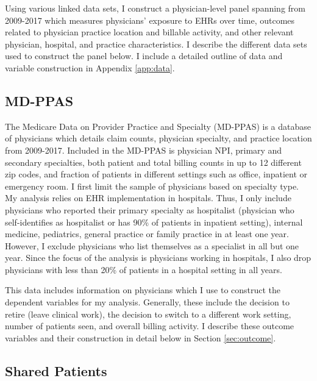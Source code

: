 \documentclass[11pt]{article}
\begin{document}
Using various linked data sets, I construct a physician-level panel spanning from 2009-2017 which measures physicians' exposure to EHRs over time, outcomes related to physician practice location and billable activity, and other relevant physician, hospital, and practice characteristics. I describe the different data sets used to construct the panel below. I include a detailed outline of data and variable construction in Appendix \ref{app:data}.

\subsection{MD-PPAS}

The Medicare Data on Provider Practice and Specialty (MD-PPAS) is a database of physicians which details claim counts, physician specialty, and practice location from 2009-2017. Included in the MD-PPAS is physician NPI, primary and secondary specialties, both patient and total billing counts in up to 12 different zip codes, and fraction of patients in different settings such as office, inpatient or emergency room. I first limit the sample of physicians based on specialty type. My analysis relies on EHR implementation in hospitals. Thus, I only include physicians who reported their primary specialty as hospitalist (physician who self-identifies as hospitalist or has 90\% of patients in inpatient setting), internal medicine, pediatrics, general practice or family practice in at least one year. However, I exclude physicians who list themselves as a specialist in all but one year. Since the focus of the analysis is physicians working in hospitals, I also drop physicians with less than 20\% of patients in a hospital setting in all years.

This data includes information on physicians which I use to construct the dependent variables for my analysis. Generally, these include the decision to retire (leave clinical work), the decision to switch to a different work setting, number of patients seen, and overall billing activity. I describe these outcome variables and their construction in detail below in Section \ref{sec:outcome}.


\subsection{Shared Patients}
\end{document}

